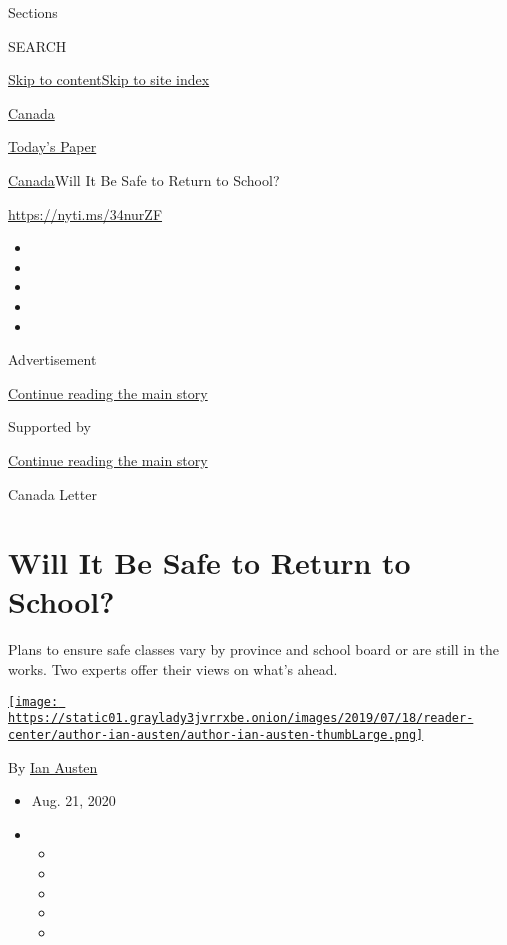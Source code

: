 Sections

SEARCH

\protect\hyperlink{site-content}{Skip to
content}\protect\hyperlink{site-index}{Skip to site index}

\href{https://www.nytimes3xbfgragh.onion/section/world/canada}{Canada}

\href{https://myaccount.nytimes3xbfgragh.onion/auth/login?response_type=cookie\&client_id=vi}{}

\href{https://www.nytimes3xbfgragh.onion/section/todayspaper}{Today's
Paper}

\href{/section/world/canada}{Canada}\textbar{}Will It Be Safe to Return
to School?

\url{https://nyti.ms/34nurZF}

\begin{itemize}
\item
\item
\item
\item
\item
\end{itemize}

Advertisement

\protect\hyperlink{after-top}{Continue reading the main story}

Supported by

\protect\hyperlink{after-sponsor}{Continue reading the main story}

Canada Letter

\hypertarget{will-it-be-safe-to-return-to-school}{%
\section{Will It Be Safe to Return to
School?}\label{will-it-be-safe-to-return-to-school}}

Plans to ensure safe classes vary by province and school board or are
still in the works. Two experts offer their views on what's ahead.

\href{https://www.nytimes3xbfgragh.onion/by/ian-austen}{\texttt{[image: https://static01.graylady3jvrrxbe.onion/images/2019/07/18/reader-center/author-ian-austen/author-ian-austen-thumbLarge.png]}}

By \href{https://www.nytimes3xbfgragh.onion/by/ian-austen}{Ian Austen}

\begin{itemize}
\item
  Aug. 21, 2020
\item
  \begin{itemize}
  \item
  \item
  \item
  \item
  \item
  \end{itemize}
\end{itemize}

